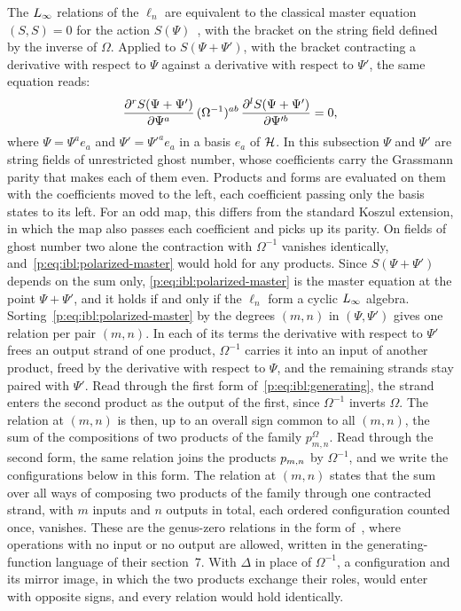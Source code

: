 The $L_\infty$ relations of the $\ell_n$ are equivalent to the classical master equation $(S, S) = 0$ for the action $S(\Psi)$~\cite{Zwiebach:1993:ClosedStringField}, with the bracket on the string field defined by the inverse of $\Omega$.
Applied to $S(\Psi + \Psi')$, with the bracket contracting a derivative with respect to $\Psi$ against a derivative with respect to $\Psi'$, the same equation reads:
\begin{equation}
  \label{p:eq:ibl:polarized-master}
  \frac{\partial^r S(\Psi + \Psi')}{\partial \Psi^a} \, (\Omega^{-1})^{ab} \, \frac{\partial^l S(\Psi + \Psi')}{\partial \Psi'^b}
    = 0,
\end{equation}
where $\Psi = \Psi^a e_a$ and $\Psi' = \Psi'^a e_a$ in a basis $e_a$ of $\mathcal{H}$.
In this subsection $\Psi$ and $\Psi'$ are string fields of unrestricted ghost number, whose coefficients carry the Grassmann parity that makes each of them even.
Products and forms are evaluated on them with the coefficients moved to the left, each coefficient passing only the basis states to its left.
For an odd map, this differs from the standard Koszul extension, in which the map also passes each coefficient and picks up its parity.
On fields of ghost number two alone the contraction with $\Omega^{-1}$ vanishes identically, and~\eqref{p:eq:ibl:polarized-master} would hold for any products.
Since $S(\Psi + \Psi')$ depends on the sum only, \eqref{p:eq:ibl:polarized-master} is the master equation at the point $\Psi + \Psi'$, and it holds if and only if the $\ell_n$ form a cyclic $L_\infty$ algebra.
Sorting~\eqref{p:eq:ibl:polarized-master} by the degrees $(m, n)$ in $(\Psi, \Psi')$ gives one relation per pair $(m, n)$.
In each of its terms the derivative with respect to $\Psi'$ frees an output strand of one product, $\Omega^{-1}$ carries it into an input of another product, freed by the derivative with respect to $\Psi$, and the remaining strands stay paired with $\Psi'$.
Read through the first form of~\eqref{p:eq:ibl:generating}, the strand enters the second product as the output of the first, since $\Omega^{-1}$ inverts $\Omega$.
The relation at $(m, n)$ is then, up to an overall sign common to all $(m, n)$, the sum of the compositions of two products of the family $p^{\Omega}_{m, n}$.
Read through the second form, the same relation joins the products $p_{m,n}$ by $\Omega^{-1}$, and we write the configurations below in this form.
The relation at $(m, n)$ states that the sum over all ways of composing two products of the family through one contracted strand, with $m$ inputs and $n$ outputs in total, each ordered configuration counted once, vanishes.
These are the genus-zero \IBL{} relations in the form of~\cite[sec.~8]{Cieliebak:2015:HomologicalAlgebraRelated}, where operations with no input or no output are allowed, written in the generating-function language of their section~7.
With $\Delta$ in place of $\Omega^{-1}$, a configuration and its mirror image, in which the two products exchange their roles, would enter with opposite signs, and every relation would hold identically.

